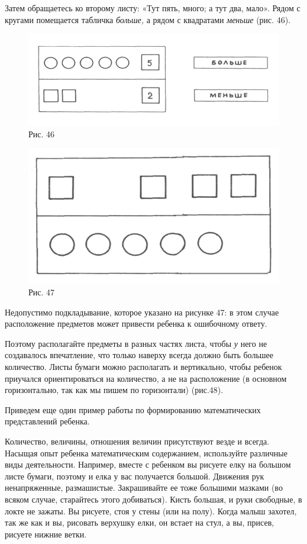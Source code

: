 \documentclass{book}
\renewcommand{\emph}[1]{\textit{#1}}
\begin{document}
Затем обращаетесь ко второму листу: «Тут пять, много; а тут два, мало».
Рядом с кругами помещается табличка \emph{больше,} а рядом с квадратами
\emph{меньше} (рис. 46).

\begin{figure}
\centering
\includegraphics[width=\linewidth]{media/media/image42.png}
\caption*{Рис. 46}
\end{figure}

\begin{figure}
\centering
\includegraphics[width=\linewidth]{media/media/image43.png}
\caption*{Рис. 47}
\end{figure}

Недопустимо подкладывание, которое указано на рисунке 47: в этом случае
расположение предметов может привести ребенка к ошибочному ответу.

Поэтому располагайте предметы в разных частях листа, чтобы \emph{у} него
не создавалось впечатление, что только наверху всегда должно быть
большее количество. Листы бумаги можно располагать и вертикально, чтобы
ребенок приучался ориентироваться на количество, а не на расположение (в
основном горизонтально, так как мы пишем по горизонтали) (рис.48).

Приведем еще один пример работы по формированию математических
представлений ребенка.

Количество, величины, отношения величин присутствуют везде и всегда.
Насыщая опыт ребенка математическим содержанием, используйте различные
виды деятельности. Например, вместе с ребенком вы рисуете елку на
большом листе бумаги, поэтому и елка у вас получается большой. Движения
рук ненапряженные, размашистые. Закрашивайте ее тоже большими мазками
(во всяком случае, старайтесь этого добиваться). Кисть большая, и руки
свободные, в локте не зажаты. Вы рисуете, стоя у стены (или на полу).
Когда малыш захотел, так же как и вы, рисовать верхушку елки, он встает
на стул, а вы, присев, рисуете нижние ветки.
\end{document}
